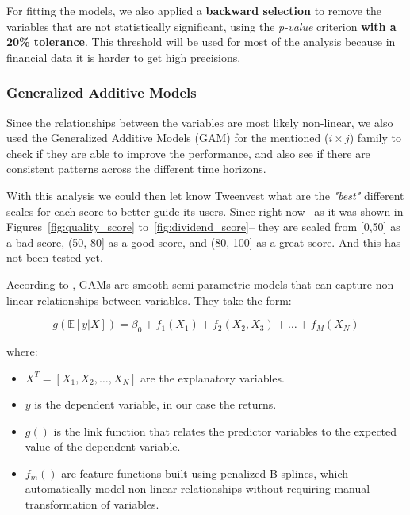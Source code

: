 \documentclass[11pt,english,a4paper,hidelinks]{book}
\begin{document}
\noindent For fitting the models, we also applied a \textbf{backward selection} to remove the variables that are not statistically significant, using the \textit{p-value} criterion \textbf{with a 20\% tolerance}. This threshold will be used for most of the analysis because in financial data it is harder to get high precisions.

\subsubsection{Generalized Additive Models}

Since the relationships between the variables are most likely non-linear, we also used the Generalized Additive Models (GAM) for the mentioned (\(i \times j\)) family to check if they are able to improve the performance, and also see if there are consistent patterns across the different time horizons.

\vspace{0.5cm}
\noindent With this analysis we could then let know Tweenvest what are the \textit{"best"} different scales for each score to better guide its users. Since right now --as it was shown in Figures~\ref{fig:quality_score} to~\ref{fig:dividend_score}-- they are scaled from [0,50] as a bad score, (50, 80] as a good score, and (80, 100] as a great score. And this has not been tested yet.

\vspace{0.5cm}
\noindent According to \textcite{pygam2018}, GAMs are smooth semi-parametric models that can capture non-linear relationships between variables. They take the form:

\begin{equation}
    g(\mathbb{E}[y|X]) = \beta_0 + f_1(X_1) + f_2(X_2,X_3) + \dots + f_M(X_N)
\end{equation}

\noindent where:
\begin{itemize}
    \item \(X^T = [X_1, X_2, \dots, X_N]\) are the explanatory variables.
    \item \(y\) is the dependent variable, in our case the returns.
    \item \(g()\) is the link function that relates the predictor variables to the expected value of the dependent variable.
    \item \(f_m()\) are feature functions built using penalized B-splines, which automatically model non-linear relationships without requiring manual transformation of variables.
\end{itemize}
\end{document}
